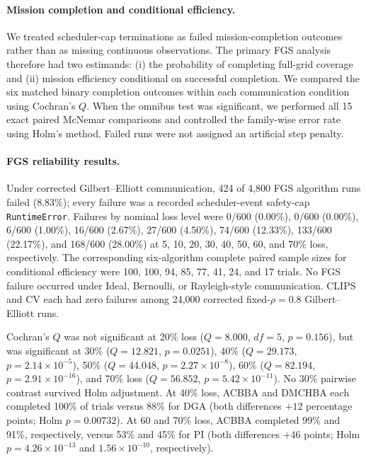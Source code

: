 
\paragraph{Mission completion and conditional efficiency.}
We treated scheduler-cap terminations as failed mission-completion outcomes rather than as missing continuous observations.  The primary FGS analysis therefore had two estimands: (i) the probability of completing full-grid coverage and (ii) mission efficiency conditional on successful completion.  We compared the six matched binary completion outcomes within each communication condition using Cochran's $Q$.  When the omnibus test was significant, we performed all 15 exact paired McNemar comparisons and controlled the family-wise error rate using Holm's method.  Failed runs were not assigned an artificial step penalty.

\paragraph{FGS reliability results.}
Under corrected Gilbert--Elliott communication, 424 of 4,800 FGS algorithm runs failed (8.83\%); every failure was a recorded scheduler-event safety-cap \texttt{RuntimeError}.  Failures by nominal loss level were 0/600 (0.00\%), 0/600 (0.00\%), 6/600 (1.00\%), 16/600 (2.67\%), 27/600 (4.50\%), 74/600 (12.33\%), 133/600 (22.17\%), and 168/600 (28.00\%) at 5, 10, 20, 30, 40, 50, 60, and 70\% loss, respectively.  The corresponding six-algorithm complete paired sample sizes for conditional efficiency were 100, 100, 94, 85, 77, 41, 24, and 17 trials.  No FGS failure occurred under Ideal, Bernoulli, or Rayleigh-style communication.  CLIPS and CV each had zero failures among 24,000 corrected fixed-$\rho=0.8$ Gilbert--Elliott runs.

Cochran's $Q$ was not significant at 20\% loss ($Q=8.000$, $df=5$, $p=0.156$), but was significant at 30\% ($Q=12.821$, $p=0.0251$), 40\% ($Q=29.173$, $p=2.14\times10^{-5}$), 50\% ($Q=44.048$, $p=2.27\times10^{-8}$), 60\% ($Q=82.194$, $p=2.91\times10^{-16}$), and 70\% loss ($Q=56.852$, $p=5.42\times10^{-11}$).  No 30\% pairwise contrast survived Holm adjustment.  At 40\% loss, ACBBA and DMCHBA each completed 100\% of trials versus 88\% for DGA (both differences $+12$ percentage points; Holm $p=0.00732$).  At 60 and 70\% loss, ACBBA completed 99\% and 91\%, respectively, versus 53\% and 45\% for PI (both differences $+46$ points; Holm $p=4.26\times10^{-13}$ and $1.56\times10^{-10}$, respectively).

